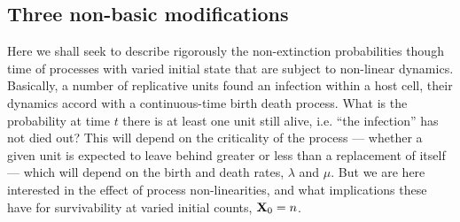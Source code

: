 \subsection*{Three non-basic modifications}
Here we shall seek to describe rigorously the non-extinction probabilities though time of processes with varied initial state that are subject to non-linear dynamics. Basically, a number of replicative units found an infection within a host cell, their dynamics accord with a continuous-time birth death process. What is the probability at time $t$ there is at least one unit still alive, i.e. ``the infection'' has not died out? This will depend on the criticality of the process --- whether a given unit is expected to leave behind greater or less than a replacement of itself --- which will depend on the birth and death rates, $\lambda$ and $\mu$. But we are here interested in the effect of process non-linearities, and what implications these have for survivability at varied initial counts, ${\bf X}_0 = n$.\par

